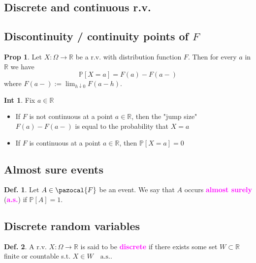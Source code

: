 \documentclass[8pt,a4paper,landscape]{article}
\theoremstyle{definition}
\newtheorem{definition}{Def.}[section]
\theoremstyle{example}
\theoremstyle{intuition}
\newtheorem*{intuition}{Int}
\theoremstyle{definition}
\newtheorem{proposition}{Prop}[section]
\newcommand{\Fb}{\pazocal{F}}
\newcommand{\mydef}[1]{\textcolor{magenta}{\textbf{#1}}}
\newcommand{\prob}[1]{\mathbb{P}\left[ #1 \right]}
\begin{document}
\begin{multicols}{3}
	\section{Discrete and continuous r.v.}
		\subsection{Discontinuity / continuity points of $F$}
			
			\begin{proposition}
				Let $X : \Omega \to \mathbb{R}$ be a r.v. with distribution function $F$. Then for every $a$ in $\mathbb{R}$ we have
				$$
					\prob{X = a} = F(a) - F(a-)
				$$
				where $F(a-) := \lim_{h \downarrow 0}F(a-h)$.
			\end{proposition}

			\begin{intuition}
				Fix $a \in \mathbb{R}$
				\begin{itemize}[label=$\rightarrow$]
					\item If $F$ is not continuous at a point $a \in \mathbb{R}$, then the "jump size" $F(a) - F(a-)$ is equal to the probability that $X = a$
					\item If $F$ is continuous at a point $a \in \mathbb{R}$, then $\prob{X = a} = 0$
				\end{itemize}
			\end{intuition}

	
		\subsection{Almost sure events}
			
			\begin{definition}
				Let $A \in \Fb$ be an event. We say that $A$ occurs \mydef{almost surely} (\mydef{a.s.}) if $\prob{A} = 1$.
			\end{definition}

		
		\subsection{Discrete random variables}

			\begin{definition}
				A r.v. $X : \Omega \to \mathbb{R}$ is said to be \mydef{discrete} if there exists some set $W \subset \mathbb{R}$ finite or countable s.t. $X \in W \quad \text{a.s.}$.
			\end{definition}


\end{multicols}
\end{document}
